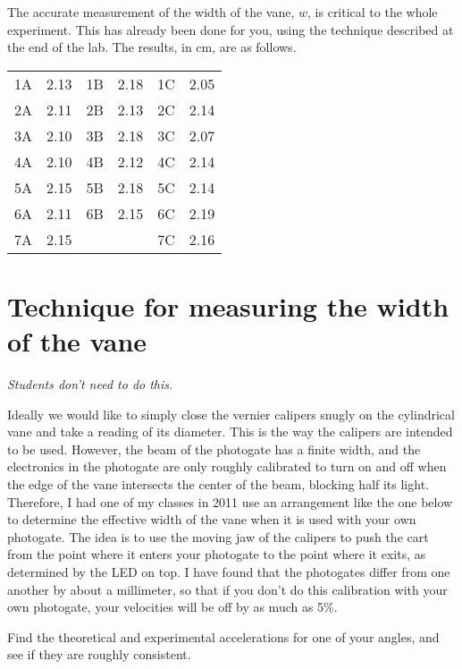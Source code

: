 The accurate measurement of the width of the vane, $w$, is critical
to the whole experiment. This has already been done for you, using the technique
described at the end of the lab. The results, in cm, are as follows.

\noindent \begin{tabular}{llllll}
1A & 2.13 & 1B & 2.18 & 1C & 2.05 \\
2A & 2.11 & 2B & 2.13 & 2C & 2.14 \\
3A & 2.10 & 3B & 2.18 & 3C & 2.07 \\
4A & 2.10 & 4B & 2.12 & 4C & 2.14 \\
5A & 2.15 & 5B & 2.18 & 5C & 2.14 \\
6A & 2.11 & 6B & 2.15 & 6C & 2.19 \\
7A & 2.15 &    &      & 7C & 2.16 \\
\end{tabular}

\section*{Technique for measuring the width of the vane}

\emph{Students don't need to do this.}

Ideally we would like to simply close the vernier calipers snugly on the
cylindrical vane and take a reading of its diameter. This is the way the
calipers are intended to be used. However, the beam of the photogate
has a finite width, and the electronics in the photogate are only roughly
calibrated to turn on and off when the edge of the vane intersects the
center of the beam, blocking half its light. Therefore, I had one of my classes in 2011 use
an arrangement like the one below to determine the effective width of the
vane when it is used with your own photogate. The idea is to use the moving jaw of the calipers
to push the cart from the point where it enters your photogate to the point
where it exits, as determined by the LED on top. I have found that the
photogates differ from one another by about a millimeter, so that if you
don't do this calibration with your own photogate, your velocities will be
off by as much as 5\%. 


\selfcheck

Find the theoretical and experimental accelerations for one
of your angles, and see if they are roughly consistent.

\prelab

